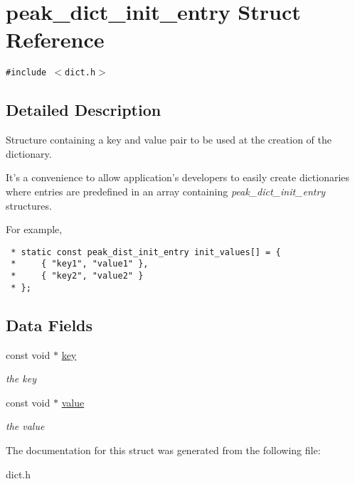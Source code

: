 \hypertarget{structpeak__dict__init__entry}{
\section{peak\_\-dict\_\-init\_\-entry Struct Reference}
\label{structpeak__dict__init__entry}
}
{\tt \#include $<$dict.h$>$}



\subsection{Detailed Description}
Structure containing a key and value pair to be used at the creation of the dictionary. 

It's a convenience to allow application's developers to easily create dictionaries where entries are predefined in an array containing {\em peak\_\-dict\_\-init\_\-entry\/} structures.

\begin{Desc}
\item[]For example, 

\footnotesize\begin{verbatim}
 * static const peak_dist_init_entry init_values[] = {
 *     { "key1", "value1" },
 *     { "key2", "value2" }
 * }; \end{verbatim}
\normalsize
\end{Desc}


\subsection*{Data Fields}
\begin{CompactItemize}
\item 
\hypertarget{structpeak__dict__init__entry_o0}{
const void $\ast$ \hyperlink{structpeak__dict__init__entry_o0}{key}}
\label{structpeak__dict__init__entry_o0}

\begin{CompactList}\small\item\em the key \item\end{CompactList}\item 
\hypertarget{structpeak__dict__init__entry_o1}{
const void $\ast$ \hyperlink{structpeak__dict__init__entry_o1}{value}}
\label{structpeak__dict__init__entry_o1}

\begin{CompactList}\small\item\em the value \item\end{CompactList}\end{CompactItemize}


The documentation for this struct was generated from the following file:\begin{CompactItemize}
\item 
dict.h\end{CompactItemize}
